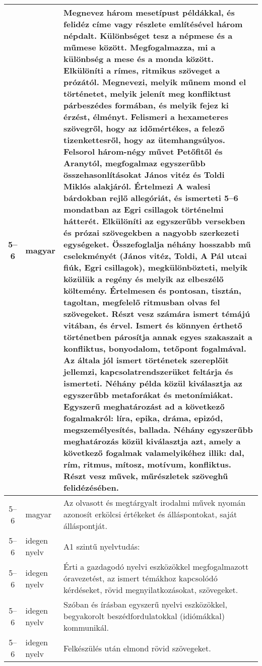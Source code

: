 \begin{small}
\begin{longtable}{c | p{2cm} |  p{11cm} }
              5--6 & magyar & Megnevez három mesetípust példákkal, és felidéz címe vagy részlete említésével három népdalt. Különbséget tesz a népmese és a műmese között. Megfogalmazza, mi a különbség a mese és a monda között. Elkülöníti a rímes, ritmikus szöveget a prózától. Megnevezi, melyik műnem mond el történetet, melyik jelenít meg konfliktust párbeszédes formában, és melyik fejez ki érzést, élményt. Felismeri a hexameteres szövegről, hogy az időmértékes, a felező tizenkettesről, hogy az ütemhangsúlyos. Felsorol három-négy művet Petőfitől és Aranytól, megfogalmaz egyszerűbb  összehasonlításokat János vitéz és Toldi Miklós alakjáról. Értelmezi A walesi bárdokban rejlő allegóriát, és ismerteti 5–6 mondatban az Egri csillagok történelmi hátterét. Elkülöníti az egyszerűbb versekben és prózai szövegekben a nagyobb szerkezeti egységeket. Összefoglalja néhány hosszabb mű cselekményét (János vitéz, Toldi, A Pál utcai fiúk, Egri csillagok), megkülönbözteti, melyik közülük a regény és melyik az elbeszélő költemény. Értelmesen és pontosan, tisztán, tagoltan, megfelelő ritmusban olvas fel szövegeket. Részt vesz számára ismert témájú vitában, és érvel. Ismert és könnyen érthető történetben párosítja annak egyes szakaszait a konfliktus, bonyodalom, tetőpont fogalmával. Az általa jól ismert történetek szereplőit jellemzi, kapcsolatrendszerüket feltárja és ismerteti. Néhány példa közül kiválasztja az egyszerűbb metaforákat és metonímiákat. Egyszerű meghatározást ad a következő fogalmakról: líra, epika, dráma, epizód, megszemélyesítés, ballada. Néhány egyszerűbb meghatározás közül kiválasztja azt, amely a következő fogalmak valamelyikéhez illik: dal, rím, ritmus, mítosz, motívum, konfliktus. Részt vesz művek, műrészletek szöveghű felidézésében.  \\ \hline
              5--6 & magyar & Az olvasott és megtárgyalt irodalmi művek nyomán azonosít erkölcsi értékeket és álláspontokat, saját álláspontját. \\ \hline
              5--6 & idegen nyelv & A1 szintű nyelvtudás: \\ \hline
              5--6 & idegen nyelv & Érti a gazdagodó nyelvi eszközökkel megfogalmazott óravezetést, az ismert témákhoz kapcsolódó kérdéseket, rövid megnyilatkozásokat, szövegeket. \\ \hline
              5--6 & idegen nyelv & Szóban és írásban egyszerű nyelvi eszközökkel, begyakorolt beszédfordulatokkal (idiómákkal) kommunikál. \\ \hline
              5--6 & idegen nyelv & Felkészülés után elmond rövid szövegeket. \\ \hline

\end{longtable}
\end{small}
